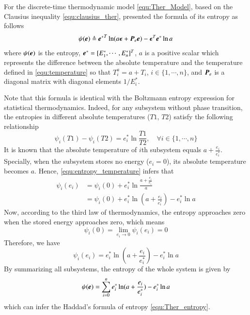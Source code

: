 \documentclass[preprint,authoryear,12pt]{elsarticle}
\renewcommand{\vec}[1]{\mbox{\boldmath$#1$}}
\newcommand{\mat}[1]{\mbox{\boldmath$#1$}}
\begin{document}
For the discrete-time thermodynamic model \eqref{equ:Ther_Model},
based on the Clausius inequality \eqref{equ:clausius_ther},
\citet{haddad_thermodynamic_2005} presented the formula of its
entropy as follows
\begin{equation}
\psi(\vec{e}) \triangleq{\vec{e}^*}^T \ln
(a\vec{\epsilon}+\mat{P}_e\vec{e}) -\vec{\epsilon}^T\vec{e}^*\ln a
\label{equ:Ther_entropy}
\end{equation}
where $\psi(\vec{e})$ is the entropy,
$\vec{e}^*=[E^*_1,\cdots,E^*_n]^T$, $a$ is a positive scalar which
represents the difference between the absolute temperature and the
temperature defined in \eqref{equ:temperature} so that $T^a_i=a+T_i$,
$i\in\{1,\cdots,n\}$, and $\mat{P}_e$ is a diagonal matrix with
diagonal elements $1/E^*_i$.

Note that this formula is identical with the Boltzmann entropy
expression for statistical thermodynamics. Indeed, for any subsystem
without phase transition, the entropies in different absolute
temperatures ($T1$, $T2$) satisfy the following relationship
\citep{cengel_thermodynamics:_2001}
\begin{equation}\label{equ:entropy_temperature}
\psi_i(T1)-\psi_i(T2)=e_i^* \ln \frac{T1}{T2},\quad \forall
i\in\{1,\cdots,n\}
\end{equation}
It is known that the absolute temperature of $i$th subsystem equals
$a+\frac{e_i}{e_i^*}$. Specially, when the subsystem stores no energy
($e_i=0$), its absolute temperature becomes $a$. Hence,
\eqref{equ:entropy_temperature} infers that
\begin{align}
\psi_i(e_i)&=\psi_i(0)+e_i^* \ln \frac{a+\frac{e_i}{e_i^*}}{a}
\nonumber\\
&=\psi_i(0)+e_i^* \ln (a+\frac{e_i}{e_i^*})-e_i^* \ln{a}
\label{equ:tmp_psi_1}
\end{align}
Now, according to the third law of thermodynamics, the entropy
approaches zero when the stored energy approaches zero, which means
\begin{equation}\label{equ:entropy_zero}
\psi_i(0)=\lim_{e_i\rightarrow 0}\psi_i(e_i)=0
\end{equation}
Therefore, we have
\begin{equation}
\psi_i(e_i)=e_i^* \ln (a+\frac{e_i}{e_i^*})-e_i^* \ln{a}
\end{equation}
By summarizing all subsystems, the entropy of the whole system is
given by
\begin{equation}
\psi(\vec{e})=\sum_{i=0}^n e_i^*\ln(a+\frac{e_i}{e_i^*})-e_i^*\ln a
\end{equation}
which can infer the Haddad's formula of entropy
\eqref{equ:Ther_entropy}.
\end{document}
